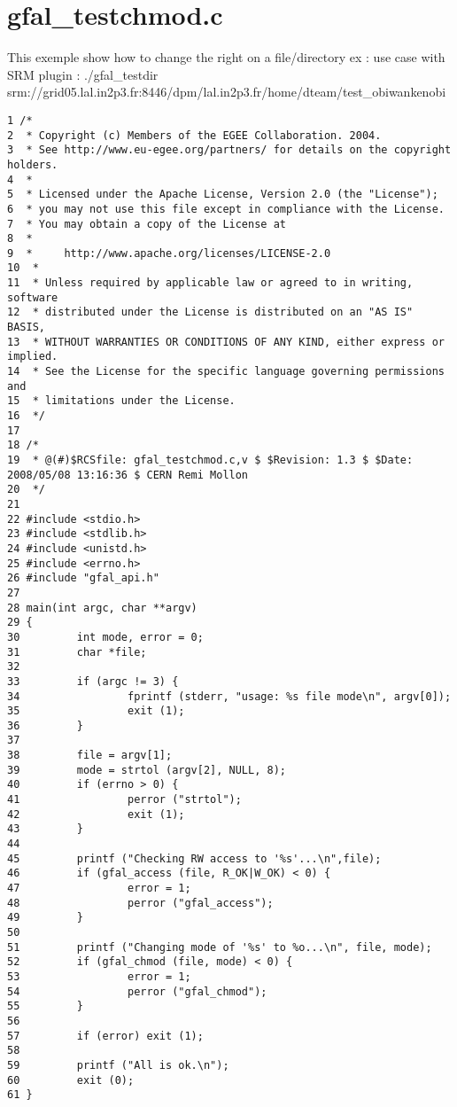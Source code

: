 \section{gfal\_\-testchmod.c}
This exemple show how to change the right on a file/directory ex : use case with SRM plugin : ./gfal\_\-testdir srm://grid05.lal.in2p3.fr:8446/dpm/lal.in2p3.fr/home/dteam/test\_\-obiwankenobi



\begin{DocInclude}\begin{verbatim}1 /*
2  * Copyright (c) Members of the EGEE Collaboration. 2004.
3  * See http://www.eu-egee.org/partners/ for details on the copyright holders.
4  *
5  * Licensed under the Apache License, Version 2.0 (the "License");
6  * you may not use this file except in compliance with the License.
7  * You may obtain a copy of the License at
8  * 
9  *     http://www.apache.org/licenses/LICENSE-2.0
10  * 
11  * Unless required by applicable law or agreed to in writing, software
12  * distributed under the License is distributed on an "AS IS" BASIS,
13  * WITHOUT WARRANTIES OR CONDITIONS OF ANY KIND, either express or implied.
14  * See the License for the specific language governing permissions and
15  * limitations under the License.
16  */
17 
18 /*
19  * @(#)$RCSfile: gfal_testchmod.c,v $ $Revision: 1.3 $ $Date: 2008/05/08 13:16:36 $ CERN Remi Mollon
20  */
21 
22 #include <stdio.h>
23 #include <stdlib.h>
24 #include <unistd.h>
25 #include <errno.h>
26 #include "gfal_api.h"
27 
28 main(int argc, char **argv)
29 {
30         int mode, error = 0;
31         char *file;
32 
33         if (argc != 3) {
34                 fprintf (stderr, "usage: %s file mode\n", argv[0]);
35                 exit (1);
36         }
37 
38         file = argv[1];
39         mode = strtol (argv[2], NULL, 8);
40         if (errno > 0) {
41                 perror ("strtol");
42                 exit (1);
43         }
44 
45         printf ("Checking RW access to '%s'...\n",file);
46         if (gfal_access (file, R_OK|W_OK) < 0) {
47                 error = 1;
48                 perror ("gfal_access");
49         }
50 
51         printf ("Changing mode of '%s' to %o...\n", file, mode);
52         if (gfal_chmod (file, mode) < 0) {
53                 error = 1;
54                 perror ("gfal_chmod");
55         }
56 
57         if (error) exit (1);
58 
59         printf ("All is ok.\n");
60         exit (0);
61 }
\end{verbatim}
\end{DocInclude}
 